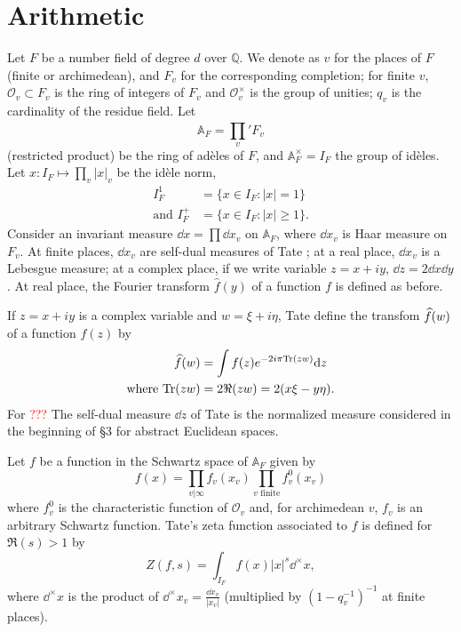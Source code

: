 \section{Arithmetic}

Let $F$ be a number field of degree $d$ over $\mathbb{Q}$.
We denote as $v$ for the places of $F$ (finite or archimedean), and $F_{v}$ for the corresponding completion; for finite $v$, $\mathcal{O}_{v} \subset F_{v}$ is the ring of integers of $F_{v}$ and $\mathcal{O}_{v}^\times$ is the group of unities; $q_{v}$ is the cardinality of the residue field.
Let
\[
    \mathbb{A}_{F} = \prod_{v}^{}{}' F_{v}
\]
(restricted product) be the ring of ad\`eles of $F$, and $\mathbb{A}_{F}^\times = I_{F}$ the group of id\`eles.
Let $x: I_{F} \mapsto \prod_{v} |x|_{v}$ be the id\`ele norm,
\begin{align*}
    I_F^{1} &= \{ x \in I_F: |x| = 1\} \\
    \text{and }I_{F}^{+} &= \{ x \in I_F: |x| \geq 1\}.
\end{align*}
Consider an invariant measure $\dd x = \prod \dd x_v$ on $\mathbb{A}_F$, where $\dd x_v$ is Haar measure on $F_v$.
At finite places, $\dd x_v$ are self-dual measures of Tate \cite{tate1967fourier}; at a real place, $\dd x_v$ is a Lebesgue measure; at a complex place, if we write variable $z = x + iy$, $\dd z =2 \dd x \dd y$.
At real place, the Fourier transform $\hat{f}(y)$ of a function $f$ is defined as before.

If $z = x + iy$ is a complex variable and $w = \xi + i \eta$, Tate define the transfom $\widehat{f}(w)$ of a function $f(z)$ by
\begin{align*}
    \widehat{f}(w) &= \int f(z) e^{-2 i \pi \mathrm{Tr}(zw)} \mathrm{d} z \\
    \text{where } \mathrm{Tr}(zw) &= 2 \Re(zw) = 2(x \xi - y \eta).
\end{align*}
For \textcolor{red}{???}
The self-dual measure $\dd z$ of Tate is the normalized measure considered in the beginning of \S 3 for abstract Euclidean spaces.

Let $f$ be a function in the Schwartz space of $\mathbb{A}_F$ given by
\begin{equation}
    \label{eqn:4.1}
    f(x) = \prod_{v|\infty} f_{v}(x_{v}) \prod_{v\text{ finite}} f_{v}^{0}(x_{v})
\end{equation}
where $f_{v}^{0}$ is the characteristic function of $\mathcal{O}_{v}$ and, for archimedean $v$, $f_{v}$ is an arbitrary Schwartz function.
Tate's zeta function associated to $f$ is defined for $\Re(s) > 1$ by
\[
    Z(f, s) = \int_{I_F} f(x) |x|^{s} \dd^\times x,
\]
where $\dd^\times x$ is the product of $\dd^\times x_v = \frac{\dd x_v}{|x_v|}$ (multiplied by $(1 - q_{v}^{-1})^{-1}$ at finite places).

